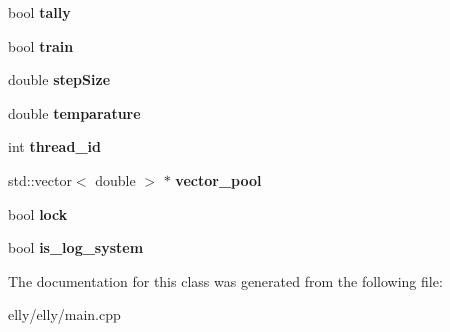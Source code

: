 \begin{DoxyCompactItemize}
\item 
\hypertarget{classmia_1_1elly_1_1_sample_task_a78c30f72cc6f55e71b22c617f4792e15}{bool {\bfseries tally}}\label{classmia_1_1elly_1_1_sample_task_a78c30f72cc6f55e71b22c617f4792e15}

\item 
\hypertarget{classmia_1_1elly_1_1_sample_task_a0afe772ae43756bdf8bb7989249ec0b1}{bool {\bfseries train}}\label{classmia_1_1elly_1_1_sample_task_a0afe772ae43756bdf8bb7989249ec0b1}

\item 
\hypertarget{classmia_1_1elly_1_1_sample_task_a030ab30b66c586f7dc0c3dac519c95a1}{double {\bfseries step\-Size}}\label{classmia_1_1elly_1_1_sample_task_a030ab30b66c586f7dc0c3dac519c95a1}

\item 
\hypertarget{classmia_1_1elly_1_1_sample_task_a06561b09384d2d9f0b330fff1d4d7a3e}{double {\bfseries temparature}}\label{classmia_1_1elly_1_1_sample_task_a06561b09384d2d9f0b330fff1d4d7a3e}

\item 
\hypertarget{classmia_1_1elly_1_1_sample_task_ab891fbcdcb66fdd2283fabf936e11b81}{int {\bfseries thread\-\_\-id}}\label{classmia_1_1elly_1_1_sample_task_ab891fbcdcb66fdd2283fabf936e11b81}

\item 
\hypertarget{classmia_1_1elly_1_1_sample_task_a36f2fe71571b038d8f9df5888576d8e8}{std\-::vector$<$ double $>$ $\ast$ {\bfseries vector\-\_\-pool}}\label{classmia_1_1elly_1_1_sample_task_a36f2fe71571b038d8f9df5888576d8e8}

\item 
\hypertarget{classmia_1_1elly_1_1_sample_task_a73c4d5c112ff7fe2f998b3a332ad43eb}{bool {\bfseries lock}}\label{classmia_1_1elly_1_1_sample_task_a73c4d5c112ff7fe2f998b3a332ad43eb}

\item 
\hypertarget{classmia_1_1elly_1_1_sample_task_a04bd3729c1156abd854d947158dfc899}{bool {\bfseries is\-\_\-log\-\_\-system}}\label{classmia_1_1elly_1_1_sample_task_a04bd3729c1156abd854d947158dfc899}

\end{DoxyCompactItemize}


The documentation for this class was generated from the following file\-:\begin{DoxyCompactItemize}
\item 
elly/elly/main.\-cpp\end{DoxyCompactItemize}
